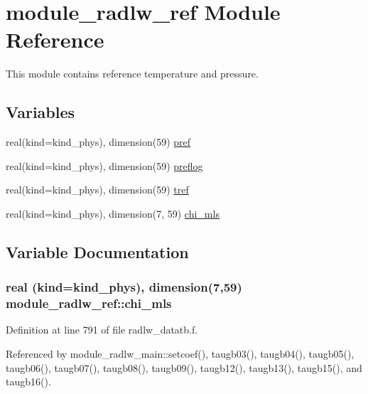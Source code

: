 \hypertarget{namespacemodule__radlw__ref}{}\section{module\+\_\+radlw\+\_\+ref Module Reference}
\label{namespacemodule__radlw__ref}


This module contains reference temperature and pressure.  


\subsection*{Variables}
\begin{DoxyCompactItemize}
\item 
real(kind=kind\+\_\+phys), dimension(59) \hyperlink{namespacemodule__radlw__ref_adda97d9a274bef59507633a3fc5a0e78}{pref}
\item 
real(kind=kind\+\_\+phys), dimension(59) \hyperlink{namespacemodule__radlw__ref_a4206f7320b6f1b59eb0132326263d2e4}{preflog}
\item 
real(kind=kind\+\_\+phys), dimension(59) \hyperlink{namespacemodule__radlw__ref_a56972f3948052e8b7f4717c192fc551d}{tref}
\item 
real(kind=kind\+\_\+phys), dimension(7, 59) \hyperlink{namespacemodule__radlw__ref_adc2bbd1ac0178afda84e74ad45404d31}{chi\+\_\+mls}
\end{DoxyCompactItemize}


\subsection{Variable Documentation}
\subsubsection[{\texorpdfstring{chi\+\_\+mls}{chi_mls}}]{\setlength{\rightskip}{0pt plus 5cm}real (kind=kind\+\_\+phys), dimension(7,59) module\+\_\+radlw\+\_\+ref\+::chi\+\_\+mls}\hypertarget{namespacemodule__radlw__ref_adc2bbd1ac0178afda84e74ad45404d31}{}\label{namespacemodule__radlw__ref_adc2bbd1ac0178afda84e74ad45404d31}


Definition at line 791 of file radlw\+\_\+datatb.\+f.



Referenced by module\+\_\+radlw\+\_\+main\+::setcoef(), taugb03(), taugb04(), taugb05(), taugb06(), taugb07(), taugb08(), taugb09(), taugb12(), taugb13(), taugb15(), and taugb16().

